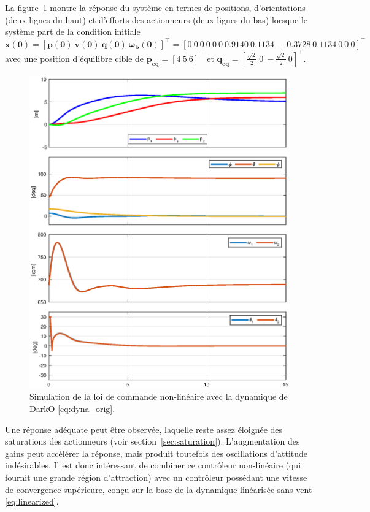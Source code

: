 La figure~\ref{fig_global_contol} montre la réponse du système en termes de positions, d'orientations (deux lignes du haut) et d'efforts des actionneurs (deux lignes du bas) lorsque le système part de la condition initiale $\boldsymbol{x(0)} = [\boldsymbol{p(0)}~ \boldsymbol{v(0)}~ \boldsymbol{q(0)}~ \boldsymbol{\omega_b(0)}]^\top = [0~0~0 ~ 0~0~0 ~0. 9140 ~0.1134~ -0.3728~ 0. 1134~ 0~ 0~ 0]^\top $ avec une position d'équilibre cible de $\boldsymbol{p_{\text{eq}}} = [4~5~6]^\top$ et $\boldsymbol{q_{\text{eq}}} = [\frac{\sqrt{2}}{2}~0~-\frac{\sqrt{2}}{2}~0]^\top$. 

\begin{figure}[ht!]
  \centering
  \includegraphics[trim=0cm 0.6cm 0cm 0.6cm,clip,width=0.8\columnwidth]{figures/global2.eps}
  \caption{Simulation de la loi de commande non-linéaire avec la dynamique de DarkO \eqref{eq:dyna_orig}.}
  \label{fig_global_contol}
\end{figure}
Une réponse adéquate peut être observée, laquelle reste assez éloignée des saturations des actionneurs (voir section~\ref{sec:saturation}). L'augmentation des gains peut accélérer la réponse, mais produit toutefois des oscillations d'attitude indésirables. Il est donc intéressant de combiner ce contrôleur non-linéaire (qui fournit une grande région d'attraction) avec un contrôleur possédant une vitesse de convergence supérieure, conçu sur la base de la dynamique linéarisée sans vent \eqref{eq:linearized}.



